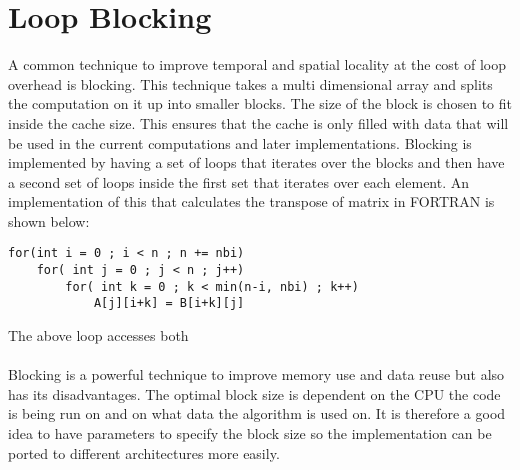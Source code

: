 \section{Loop Blocking}
A common technique to improve temporal and spatial locality at the cost of loop overhead is blocking. This technique takes a multi dimensional array and splits the computation on it up into smaller blocks. The size of the block is chosen to fit inside the cache size. This ensures that the cache is only filled with data that will be used in the current computations and later implementations. Blocking is implemented by having a set of loops that iterates over the blocks and then have a second set of loops inside the first set that iterates over each element. An implementation of this that calculates the transpose of matrix in FORTRAN is shown below:
\begin{lstlisting}
for(int i = 0 ; i < n ; n += nbi)
	for( int j = 0 ; j < n ; j++)
		for( int k = 0 ; k < min(n-i, nbi) ; k++)
			A[j][i+k] = B[i+k][j]
\end{lstlisting}
The above loop accesses both  
\\\\
Blocking is a powerful technique to improve memory use and data reuse but also has its disadvantages. The optimal block size is dependent on the CPU the code is being run on and on what data the algorithm is used on. It is therefore a good idea to have parameters to specify the block size so the implementation can be ported to different architectures more easily.